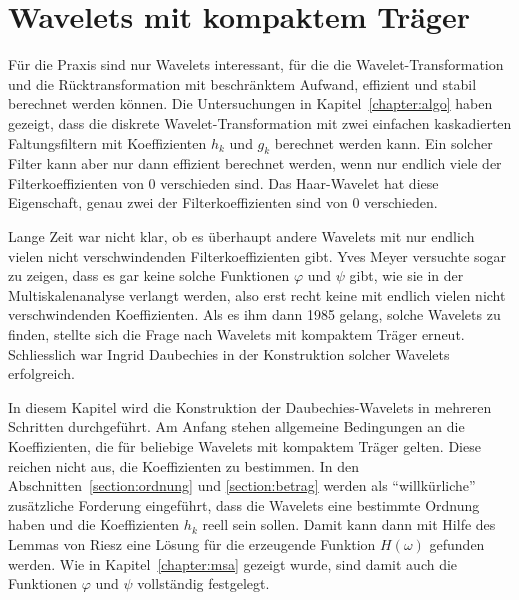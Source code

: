 %
%
%
\chapter{Wavelets mit kompaktem Träger
\label{chapter:kompakt}}
\rhead{}
Für die Praxis sind nur Wavelets interessant, für die die
Wavelet-Transformation und die Rücktransformation mit beschränktem Aufwand,
effizient und stabil berechnet werden können.
Die Untersuchungen in Kapitel~\ref{chapter:algo} haben gezeigt, dass 
die diskrete Wavelet-Transformation mit zwei einfachen kaskadierten
Faltungsfiltern mit Koeffizienten $h_k$ und $g_k$ berechnet werden kann.
Ein solcher Filter kann aber nur dann effizient berechnet werden,
wenn nur endlich viele der Filterkoeffizienten von 0 verschieden sind.
Das Haar-Wavelet hat diese Eigenschaft, genau zwei der Filterkoeffizienten
sind von 0 verschieden.

Lange Zeit war nicht klar, ob es überhaupt andere Wavelets mit
nur endlich vielen nicht verschwindenden Filterkoeffizienten gibt.
Yves Meyer versuchte sogar zu zeigen, dass es gar keine solche Funktionen
%
$\varphi$ und $\psi$ gibt, wie sie in der Multiskalenanalyse verlangt
werden, also erst recht keine mit endlich vielen nicht verschwindenden
Koeffizienten.
Als es ihm dann 1985 gelang, solche Wavelets zu finden, stellte sich
die Frage nach Wavelets mit kompaktem Träger erneut.
Schliesslich war Ingrid Daubechies in der Konstruktion solcher Wavelets
erfolgreich.

In diesem Kapitel wird die Konstruktion der Daubechies-Wavelets
in mehreren Schritten durchgeführt.
Am Anfang stehen allgemeine Bedingungen an die Koeffizienten,
die für beliebige Wavelets mit kompaktem Träger gelten.
Diese reichen nicht aus, die Koeffizienten zu bestimmen.
In den Abschnitten~\ref{section:ordnung} und \ref{section:betrag} werden
als ``willkürliche'' zusätzliche Forderung eingeführt, dass  die
Wavelets eine bestimmte Ordnung haben und die Koeffizienten $h_k$ reell
sein sollen.
Damit kann dann mit Hilfe des Lemmas von Riesz eine Lösung für die
erzeugende Funktion $H(\omega)$ gefunden werden.
Wie in Kapitel~\ref{chapter:msa} gezeigt wurde, sind damit auch
die Funktionen $\varphi$ und $\psi$ vollständig festgelegt.











